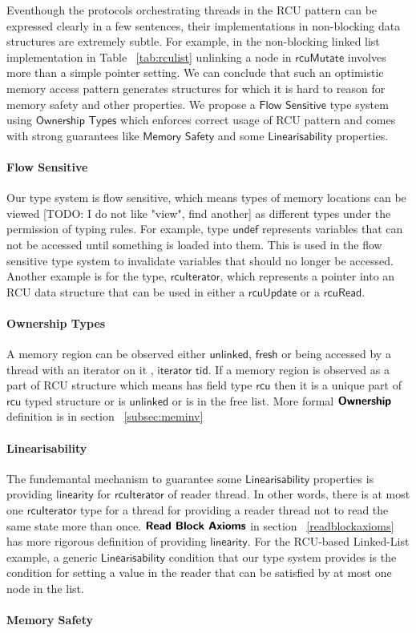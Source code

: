 \documentclass{article}
\begin{document}
Eventhough the protocols orchestrating threads in the RCU pattern can be expressed clearly in a few sentences, their implementations in non-blocking data structures are extremely subtle.  For example, in the non-blocking linked list implementation in Table ~\ref{tab:rculist}  unlinking a node in $\textsf{rcuMutate}$ involves more than a simple pointer setting. We can conclude that such an optimistic memory access pattern generates structures for which it is hard to reason for memory safety and other properties. We propose a $\textsf{Flow Sensitive}$ type system using $\textsf{Ownership Types}$ which enforces correct usage of RCU pattern  and comes with strong guarantees like $\textsf{Memory Safety}$ and some $\textsf{Linearisability}$ properties. 

\paragraph{Flow Sensitive} Our type system is flow sensitive, which means types of memory locations can be viewed [TODO: I do not like "view", find another] as different types under the permission of typing rules. For example, type $\textsf{undef}$ represents variables that can not be accessed until something is loaded into them. This is used in the flow sensitive type system to invalidate variables that should no longer be accessed. Another example is for the type, $\textsf{rcuIterator}$, which represents a pointer into an RCU data structure that can be used in either a $\textsf{rcuUpdate}$ or a $\textsf{rcuRead}$.
\paragraph{Ownership Types} A memory region can be observed either $\textsf{unlinked}$, $\textsf{fresh}$ or being accessed by a thread with an iterator on it , $\textsf{iterator tid}$.  If a memory region is observed as a part of RCU structure which means has field type $\textsf{rcu}$ then it is a unique part of $\textsf{rcu}$ typed structure or is $\textsf{unlinked}$  or is in the free list. More formal $\textbf{\textsf{Ownership}}$ definition is in section ~\ref{subsec:meminv} 
\paragraph{Linearisability} The fundemantal mechanism to guarantee some $\textsf{Linearisability}$ properties is providing $\textsf{linearity}$ for $\textsf{rcuIterator}$ of reader thread.  In other words, there is at most one $\textsf{rcuIterator}$ type for a thread for providing a reader thread not to read the same state more than once.  $\textbf{\textsf{Read Block Axioms}}$ in section ~\ref{readblockaxioms} has more rigorous definition of providing $\textsf{linearity}$. For the RCU-based Linked-List example, a generic $\textsf{Linearisability}$ condition that our type system provides is the condition for setting a value in the reader that can be satisfied by at most one node in the list.
\paragraph{Memory Safety} 
\end{document}
